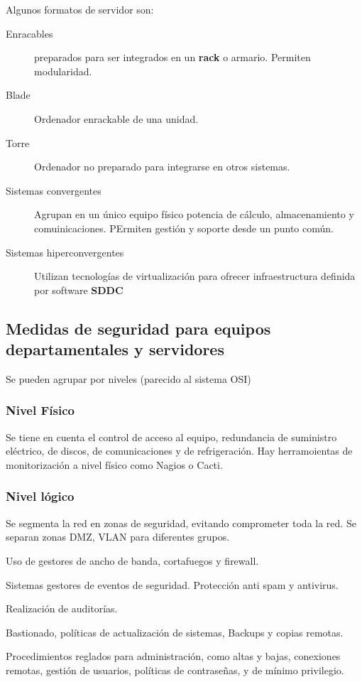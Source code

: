 Algunos formatos de servidor son:
\begin{description}
    \item[Enracables] preparados para ser integrados en un \textbf{rack} o armario. Permiten modularidad.
    \item[Blade] Ordenador enrackable de una unidad.
    \item[Torre] Ordenador no preparado para integrarse en otros sistemas.
    \item[Sistemas convergentes] Agrupan en un único equipo físico potencia de cálculo, almacenamiento y comuinicaciones. PErmiten gestión y soporte desde un punto común.
    \item[Sistemas hiperconvergentes] Utilizan tecnologías de virtualización para ofrecer infraestructura definida por software \textbf{SDDC}
\end{description}

\subsection{Medidas de seguridad para equipos departamentales y servidores}

Se pueden agrupar por niveles (parecido al sistema OSI)

\subsubsection{Nivel Físico}
Se tiene en cuenta el control de acceso al equipo, redundancia de suministro eléctrico, de discos, de comunicaciones y de refrigeración. Hay herramoientas de monitorización a nivel físico como Nagios o Cacti.

\subsubsection{Nivel lógico}
Se segmenta la red en zonas de seguridad, evitando comprometer toda la red. Se separan zonas DMZ, VLAN para diferentes grupos.

Uso de gestores de ancho de banda, cortafuegos y firewall. 

Sistemas gestores de eventos de seguridad. Protección anti spam y antivirus.

Realización de auditorías.

Bastionado, políticas de actualización de sistemas, Backups y copias remotas.

Procedimientos reglados para administración, como altas y bajas, conexiones remotas, gestión de usuarios, políticas de contraseñas, y de mínimo privilegio.

